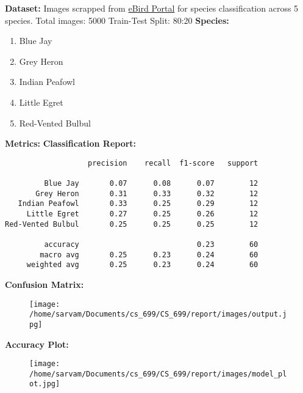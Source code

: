 \documentclass{article}
\begin{document}
\noindent \textbf{Dataset:}
Images scrapped from \href{https://ebird.org/explore}{eBird Portal}  for species classification across 5 species.
\newline
Total images: 5000
\newline
Train-Test Split: 80:20
\newline
\newline
\noindent \textbf{Species:}
\begin{enumerate}[noitemsep]
  \item Blue Jay
  \item Grey Heron
  \item Indian Peafowl
  \item Little Egret
  \item Red-Vented Bulbul
\end{enumerate}
\vspace{5mm}
\noindent \textbf{Metrics:}
\newline
\newline
\noindent \textbf{Classification Report:}

\begin{verbatim}                   precision    recall  f1-score   support

         Blue Jay       0.07      0.08      0.07        12
       Grey Heron       0.31      0.33      0.32        12
   Indian Peafowl       0.33      0.25      0.29        12
     Little Egret       0.27      0.25      0.26        12
Red-Vented Bulbul       0.25      0.25      0.25        12

         accuracy                           0.23        60
        macro avg       0.25      0.23      0.24        60
     weighted avg       0.25      0.23      0.24        60
\end{verbatim}
\newpage
\noindent \textbf{Confusion Matrix:}

\begin{figure}[h!]
\centering
\texttt{[image: /home/sarvam/Documents/cs\_699/CS\_699/report/images/output.jpg]}
\end{figure}
\noindent \textbf{Accuracy Plot:}
\begin{figure}[h!]
\centering
\texttt{[image: /home/sarvam/Documents/cs\_699/CS\_699/report/images/model\_plot.jpg]}
\end{figure}
\end{document}
